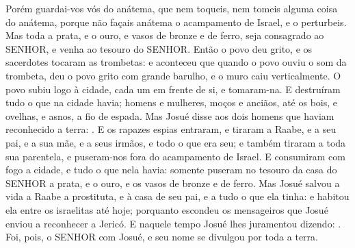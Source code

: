 {{Porém guardai-vos vós do anátema, que nem toqueis, nem tomeis alguma coisa do anátema, porque não façais anátema o acampamento de Israel, e o perturbeis.
Mas toda a prata, e o ouro, e vasos de bronze e de ferro, seja consagrado ao SENHOR, e venha ao tesouro do SENHOR}.
Então o povo deu grito, e os sacerdotes tocaram as trombetas: e aconteceu que quando o povo ouviu o som da trombeta, deu o povo grito com grande barulho, e o muro caiu verticalmente. O povo subiu logo à cidade, cada um em frente de si, e tomaram-na.
E destruíram tudo o que na cidade havia; homens e mulheres, moços e anciãos, até os bois, e ovelhas, e asnos, a fio de espada.
Mas Josué disse aos dois homens que haviam reconhecido a terra: .
E os rapazes espias entraram, e tiraram a Raabe, e a seu pai, e a sua mãe, e a seus irmãos, e todo o que era seu; e também tiraram a toda sua parentela, e puseram-nos fora do acampamento de Israel.
E consumiram com fogo a cidade, e tudo o que nela havia: somente puseram no tesouro da casa do SENHOR a prata, e o ouro, e os vasos de bronze e de ferro.
Mas Josué salvou a vida a Raabe a prostituta, e à casa de seu pai, e a tudo o que ela tinha: e habitou ela entre os israelitas até hoje; porquanto escondeu os mensageiros que Josué enviou a reconhecer a Jericó.
E naquele tempo Josué lhes juramentou dizendo: .
Foi, pois, o SENHOR com Josué, e seu nome se divulgou por toda a terra.

\par }

